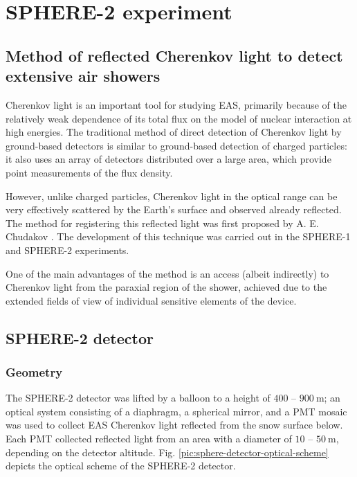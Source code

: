 \chapter{SPHERE-2 experiment}

\section{Method of reflected Cherenkov light to detect extensive air showers}

Cherenkov light is an important tool for studying EAS, primarily because of the relatively weak dependence of its total flux on the model of nuclear interaction at high energies. The traditional method of direct detection of Cherenkov light by ground-based detectors is similar to ground-based detection of charged particles: it also uses an array of detectors distributed over a large area, which provide point measurements of the flux density.

However, unlike charged particles, Cherenkov light in the optical range can be very effectively scattered by the Earth's surface and observed already reflected. The method for registering this reflected light was first proposed by A. E. Chudakov \cite{Chudakov1972}. The development of this technique was carried out in the SPHERE-1 and SPHERE-2 \cite{Antonov1997, Antonov2001} experiments.

One of the main advantages of the method is an access (albeit indirectly) to Cherenkov light from the paraxial region of the shower, achieved due to the extended fields of view of individual sensitive elements of the device.

\section{SPHERE-2 detector}
\label{sec:sphere-2-model}

\subsection{Geometry}
\label{sec:light-collection-from-surface}

The SPHERE-2 detector was lifted by a balloon to a height of $400$ -- $900~\text{m}$; an optical system consisting of a diaphragm, a spherical mirror, and a PMT mosaic was used to collect EAS Cherenkov light reflected from the snow surface below. Each PMT collected reflected light from an area with a diameter of $10$ -- $50~\text{m}$, depending on the detector altitude. Fig. \ref{pic:sphere-detector-optical-scheme} depicts the optical scheme of the SPHERE-2 detector.

